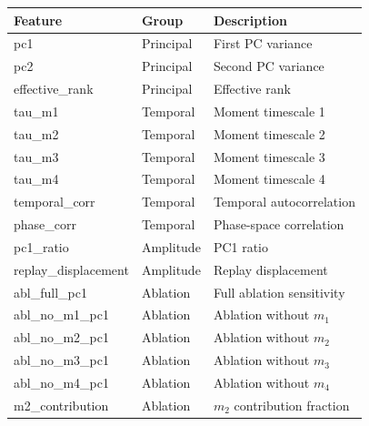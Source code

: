 \begin{tabular}{lll}
\toprule
Feature & Group & Description \\
\midrule
pc1 & Principal & First PC variance \\
pc2 & Principal & Second PC variance \\
effective_rank & Principal & Effective rank \\
tau_m1 & Temporal & Moment timescale 1 \\
tau_m2 & Temporal & Moment timescale 2 \\
tau_m3 & Temporal & Moment timescale 3 \\
tau_m4 & Temporal & Moment timescale 4 \\
temporal_corr & Temporal & Temporal autocorrelation \\
phase_corr & Temporal & Phase-space correlation \\
pc1_ratio & Amplitude & PC1 ratio \\
replay_displacement & Amplitude & Replay displacement \\
abl_full_pc1 & Ablation & Full ablation sensitivity \\
abl_no_m1_pc1 & Ablation & Ablation without $m_1$ \\
abl_no_m2_pc1 & Ablation & Ablation without $m_2$ \\
abl_no_m3_pc1 & Ablation & Ablation without $m_3$ \\
abl_no_m4_pc1 & Ablation & Ablation without $m_4$ \\
m2_contribution & Ablation & $m_2$ contribution fraction \\
\bottomrule
\end{tabular}
